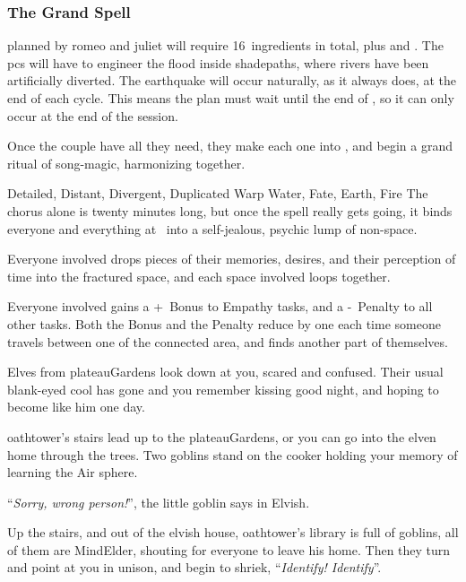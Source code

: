 \begin{multicols}{2}
\subsubsection{The Grand Spell}
\label{grandSpell}
planned by \gls{romeo} and \gls{juliet} will require 16~\glspl{ingredient} in total, plus  and .
The \glspl{pc} will have to engineer the \gls{flood} inside \gls{shadepaths}, where rivers have been artificially diverted.
The \gls{earthquake} will occur naturally, as it always does, at the end of each \gls{cycle}.
This means the plan must wait until the end of \showCycle, so it can only occur at the end of the session.

Once the couple have all they need, they make each one into , and begin a grand ritual of song-magic, harmonizing together.

  {Detailed, Distant, Divergent, Duplicated}%
  {Warp}%
  {Water, Fate, Earth, Fire}%
  {}%
  {The chorus alone is twenty minutes long, but once the spell really gets going, it binds everyone and everything at \spellRange\ into a self-jealous, psychic lump of non-space.}%
  {Everyone involved drops pieces of their memories, desires, and their perception of time into the fractured space, and each space involved loops together.

  Everyone involved gains a +~Bonus to Empathy tasks, and a -~Penalty to all other tasks.
  Both the Bonus and the Penalty reduce by one each time someone travels between one of the connected area, and finds another part of themselves.}

\begin{boxtext}
  Elves from \gls{plateauGardens} look down at you, scared and confused.
  Their usual blank-eyed cool has gone and you remember kissing  good night, and hoping to become like him one day.

  \Gls{oathtower}'s stairs lead up to the \gls{plateauGardens}, or you can go into the elven home through the trees.
  Two goblins stand on the cooker holding your memory of learning the Air \gls{sphere}.

    ``\textit{Sorry, wrong person!}'', the little goblin says in Elvish.

    Up the stairs, and out of the elvish house, \gls{oathtower}'s library is full of goblins, all of them are \gls{MindElder}, shouting for everyone to leave his home.
    Then they turn and point at you in unison, and begin to shriek, ``\textit{Identify! Identify}''.


\end{boxtext}
\end{multicols}
